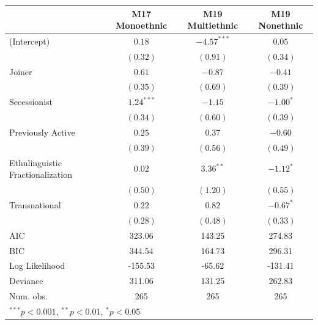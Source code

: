 \documentclass[12pt,]{book}
\let\origtable\table
\let\endorigtable\endtable
\renewenvironment{table}[1][2] {
    \singlespacing
    \expandafter\origtable\expandafter[H]
} {
    \endorigtable
}
\theoremstyle{definition}
\theoremstyle{definition}
\theoremstyle{definition}
\theoremstyle{remark}
\begin{document}
\begin{table}
\begin{center}
\begin{tabular}{l c c c }
\hline
 & M17 Monoethnic & M19 Multiethnic & M19 Nonethnic \\
\hline
(Intercept)                      & $0.18$       & $-4.57^{***}$ & $0.05$      \\
                                 & $(0.32)$     & $(0.91)$      & $(0.34)$    \\
Joiner                           & $0.61$       & $-0.87$       & $-0.41$     \\
                                 & $(0.35)$     & $(0.69)$      & $(0.39)$    \\
Secessionist                     & $1.24^{***}$ & $-1.15$       & $-1.00^{*}$ \\
                                 & $(0.34)$     & $(0.60)$      & $(0.39)$    \\
Previously Active                & $0.25$       & $0.37$        & $-0.60$     \\
                                 & $(0.39)$     & $(0.56)$      & $(0.49)$    \\
Ethnlinguistic Fractionalization & $0.02$       & $3.36^{**}$   & $-1.12^{*}$ \\
                                 & $(0.50)$     & $(1.20)$      & $(0.55)$    \\
Transnational                    & $0.22$       & $0.82$        & $-0.67^{*}$ \\
                                 & $(0.28)$     & $(0.48)$      & $(0.33)$    \\
\hline
AIC                              & 323.06       & 143.25        & 274.83      \\
BIC                              & 344.54       & 164.73        & 296.31      \\
Log Likelihood                   & -155.53      & -65.62        & -131.41     \\
Deviance                         & 311.06       & 131.25        & 262.83      \\
Num. obs.                        & 265          & 265           & 265         \\
\hline
\multicolumn{4}{l}{\scriptsize{$^{***}p<0.001$, $^{**}p<0.01$, $^*p<0.05$}}
\end{tabular}
\caption{Logit Models of Rebel Group Ethnic Composition (Conflict-Years with < 1000 Fatalities)}
\label{tab:comp-conflict}
\end{center}
\end{table}
\end{document}
